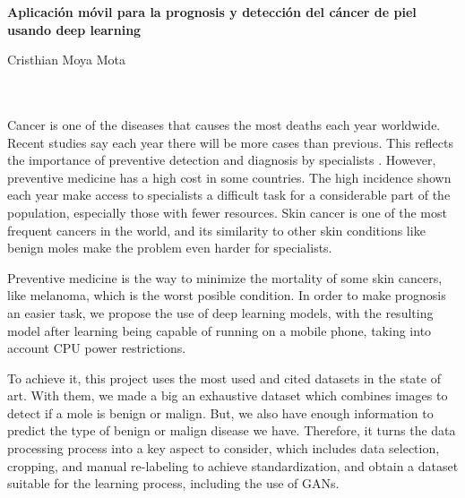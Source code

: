 \begin{center}
{\large\bfseries Aplicación móvil para la prognosis y detección del cáncer de piel usando deep learning}\\
\end{center}
\begin{center}
Cristhian Moya Mota\\
\end{center}

\\

\vspace{0.7cm}
\\

Cancer is one of the diseases that causes the most deaths each year worldwide. Recent studies say each year there will be more cases than previous. This reflects the importance of preventive detection and diagnosis by specialists . However, preventive medicine has a high cost in some countries. The high incidence shown each year make access to specialists a difficult task for a considerable part of the population, especially those with fewer resources. Skin cancer is one of the most frequent cancers in the world, and its similarity to other skin conditions like benign moles make the problem even harder for specialists.

Preventive medicine is the way to minimize the mortality of some skin cancers, like melanoma, which is the worst posible condition. In order to make prognosis an easier task, we propose the use of deep learning models, with the resulting model after learning being capable of running on a mobile phone, taking into account CPU power restrictions.

To achieve it, this project uses the most used and cited datasets in the state of art. With them, we made a big an exhaustive dataset which combines images to detect if a mole is benign or malign. But, we also have enough information to predict the type of benign or malign disease we have. Therefore, it turns the data processing process into a key aspect to consider, which includes data selection, cropping, and manual re-labeling to achieve standardization, and obtain a dataset suitable for the learning process, including the use of GANs.

